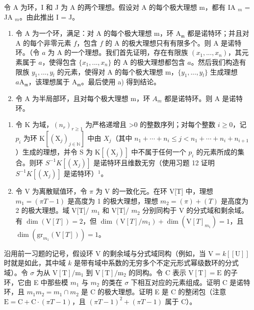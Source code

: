 令 A 为环，I 和 J 为 A 的两个理想。假设对 A 的每个极大理想 m，都有 IA \(_{m}\) = JA \(_{m}\)。由此推出 I = J。

\begin{enumerate}
\def\labelenumi{\alph{enumi})}
\setcounter{enumi}{1}
\item
  令 A 为一个环，满足：对 A 的每个极大理想 m，环 \(\mathrm{A}_{\mathfrak{m}}\) 都是诺特环；并且对 A 的每个非零元素 \(f\)，包含 \(f\) 的 A 的极大理想只有有限多个。则 A 是诺特环。（令 \(a\) 为 A 的一个理想。我们首先证明，存在有限族 \((x_1, ..., x_n)\)，其元素属于 \(a\)，使得包含 \(\{x_1, ..., x_n\}\) 的 A 的极大理想都包含 \(a\)。然后我们构造有限族 \(y_1, ..., y_l\) 的元素，使得对 A 的每个极大理想 m，\(\{y_1, ..., y_l\}\) 生成理想 \(a\mathrm{A}_{\mathfrak{m}}\)，该理想属于 \(\mathrm{A}_{\mathfrak{m}}\)。最后使用 a) 得到结论。
\item
  令 A 为半局部环，且对每个极大理想 m，环 \(A_{m}\) 都是诺特环。则 A 是诺特环。
\end{enumerate}

\begin{enumerate}
\def\labelenumi{\arabic{enumi})}
\setcounter{enumi}{12}
\item
  令 K 为域，\((n_{r})_{r\geqslant1}\) 为严格递增且 \textgreater0 的整数序列；对每个整数 \(i\geqslant0\)，记 \(p_{i}\) 为环 \(\mathrm{K}[(\mathrm{X}_{j})_{j\in\mathbb{N}}]\) 中由 \(X_{j}\)（其中 \(n_{1}+\cdots+n_{i}\leqslant j<n_{1}+\cdots+n_{i}+n_{i+1}\)）生成的理想，并令 S 为 \(\mathrm{K}[(\mathrm{X}_{j})]\) 中不属于任何一个 \(p_{i}\) 的元素所成的集合。则环 \(S^{-1}K[(X_{j})]\) 是诺特环且维数无穷（使用习题 12 证明 \(S^{-1}K[(X_{j})]\) 是诺特环）\(^{1}\)。
\item
  令 V 为离散赋值环，令 \(\pi\) 为 V 的一致化元。在环 V{[}T{]} 中，理想 \(m_1 = (\pi T - 1)\) 是高度为 1 的极大理想，理想 \(m_2 = (\pi) + (T)\) 是高度为 2 的极大理想。域 V{[}T{]}/ \(m_1\) 和 V{[}T{]}/ \(m_2\) 分别同构于 V 的分式域和剩余域。有 \(\dim(\mathrm{V}[T]) = 2\)，但 \(\dim(\mathrm{V}[T]/m_1) + \dim(\mathrm{V}[T]_{m_1}) = 1\)，且 \(\dim(\mathrm{gr}_{m_1}(\mathrm{V}[T])) = 1\)。
\end{enumerate}

  沿用前一习题的记号，假设环 V 的剩余域与分式域同构（例如，当 \(\mathrm{V} = k[[\mathrm{U}]]\) 时就是如此，其中域 \(k\) 是带有域中系数的无穷多个不定元形式幂级数环的分式域）。令 \(\sigma\) 为从 \(\mathrm{V[T] / m_1}\) 到 \(\mathrm{V[T] / m_2}\) 的同构。令 C 表示 \(\mathrm{V[T]} = \mathrm{E}\) 的子环，它由 E 中那些模 \(m_1\) 与 \(m_2\) 的类在 \(\sigma\) 下相互对应的元素组成。证明 C 是诺特环，且 \(m_1m_2 = m_1 \cap m_2\) 是 C 的极大理想。证明 E 是 C 的整闭包（注意 \(\mathrm{E} = \mathrm{C} + \mathrm{C}\cdot(\pi T - 1)\)，且 \((\pi T - 1)^2 + (\pi T - 1)\) 属于 C）。


